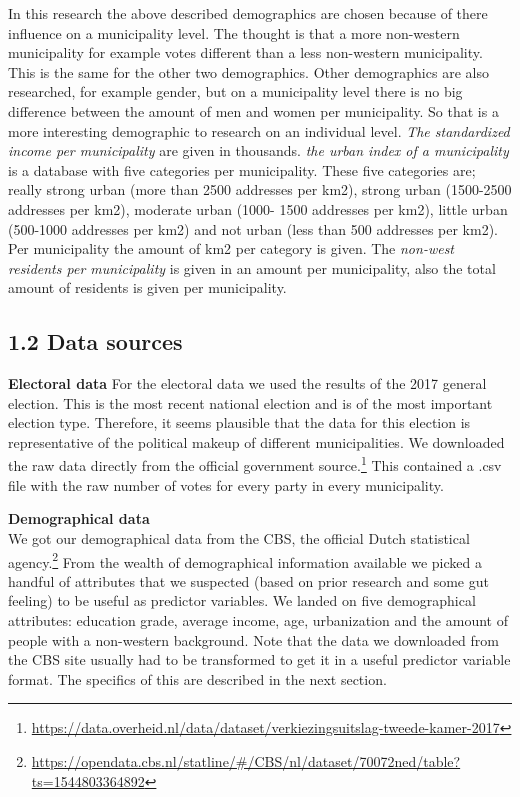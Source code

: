 \documentclass[11pt,]{article}
\let\rmarkdownfootnote\footnote%
\def\footnote{\protect\rmarkdownfootnote}
\begin{document}
In this research the above described demographics are chosen because of
there influence on a municipality level. The thought is that a more
non-western municipality for example votes different than a less
non-western municipality. This is the same for the other two
demographics. Other demographics are also researched, for example
gender, but on a municipality level there is no big difference between
the amount of men and women per municipality. So that is a more
interesting demographic to research on an individual level. \emph{The
standardized income per municipality} are given in thousands. \emph{the
urban index of a municipality} is a database with five categories per
municipality. These five categories are; really strong urban (more than
2500 addresses per km2), strong urban (1500-2500 addresses per km2),
moderate urban (1000- 1500 addresses per km2), little urban (500-1000
addresses per km2) and not urban (less than 500 addresses per km2). Per
municipality the amount of km2 per category is given. The \emph{non-west
residents per municipality} is given in an amount per municipality, also
the total amount of residents is given per municipality.

\subsection{1.2 Data sources}\label{data-sources}

\textbf{Electoral data} For the electoral data we used the results of
the 2017 general election. This is the most recent national election and
is of the most important election type. Therefore, it seems plausible
that the data for this election is representative of the political
makeup of different municipalities. We downloaded the raw data directly
from the official government source.\footnote{\url{https://data.overheid.nl/data/dataset/verkiezingsuitslag-tweede-kamer-2017}}
This contained a .csv file with the raw number of votes for every party
in every municipality.

\textbf{Demographical data}\\
We got our demographical data from the CBS, the official Dutch
statistical agency.\footnote{\url{https://opendata.cbs.nl/statline/\#/CBS/nl/dataset/70072ned/table?ts=1544803364892}}
From the wealth of demographical information available we picked a
handful of attributes that we suspected (based on prior research and
some gut feeling) to be useful as predictor variables. We landed on five
demographical attributes: education grade, average income, age,
urbanization and the amount of people with a non-western background.
Note that the data we downloaded from the CBS site usually had to be
transformed to get it in a useful predictor variable format. The
specifics of this are described in the next section.
\end{document}
